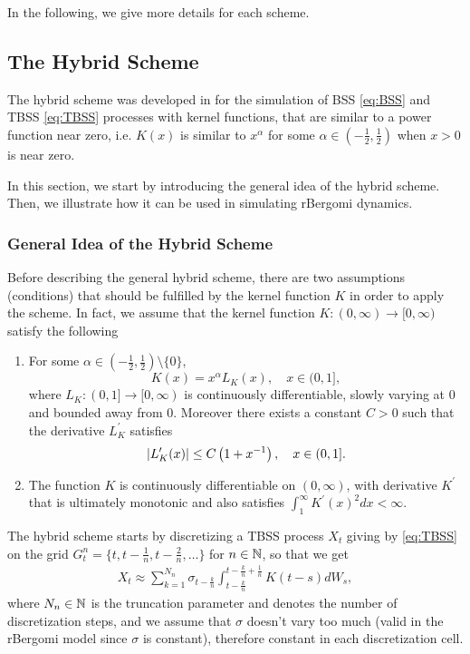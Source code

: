In the following, we give more details for each scheme. 



\subsection{The Hybrid Scheme}
The hybrid scheme was developed in \cite{bennedsen2017hybrid} for the simulation
of BSS \eqref{eq:BSS} and TBSS \eqref{eq:TBSS} processes with kernel functions, that are similar to a power function near zero, i.e. $K(x)$ is similar to $x^\alpha$ for some $\alpha \in(-\frac{1}{2},\frac{1}{2})$ when $x>0$ is near zero. 

In this section, we start by introducing the general idea of the hybrid scheme. Then, we illustrate how it can be used in simulating  rBergomi  dynamics.
\subsubsection{General Idea of the Hybrid Scheme}
Before describing the general hybrid scheme, there are two assumptions (conditions) that should be fulfilled by the kernel function $K$ in order to apply the scheme. In fact, we assume that the kernel function $K:(0,\infty)\rightarrow [0,\infty)$ satisfy the following
\begin{enumerate}
\item For some $\alpha \in(-\frac{1}{2},\frac{1}{2})\setminus\{0\}$,
$$ K(x)=x^\alpha L_K(x),\quad x \in (0,1],$$
where $L_K:(0,1] \rightarrow [0,\infty)$ is continuously differentiable, slowly varying at $0$ and bounded away from $0$. Moreover there exists a constant $C>0$ such that the derivative $L^\prime_K$ satisfies
$$ \left\lvert L_K^\prime(x)\right\rvert \le C \left(1+x^{-1}\right),\quad x \in (0,1].$$
\item The function $K$ is continuously differentiable on $(0,\infty)$, with derivative $K^\prime$ that is ultimately monotonic and also satisfies $\int_{1}^ \infty K^\prime(x)^2 dx<\infty$.
\end{enumerate}
The hybrid scheme starts by discretizing a TBSS process $X_t$ giving by \eqref{eq:TBSS} on the grid $G_{t}^n=\{t,t-\frac{1}{n},t-\frac{2}{n},\dots\}$ for $n \in \mathbb{N}$, so that we get
\begin{align}\label{eq:hybrid_scheme_1}
X_t \approx \sum_{k=1}^{N_n} \sigma_{t-\frac{k}{n}} \int_{t-\frac{k}{n}}^{t-\frac{k}{n}+\frac{1}{n}} K(t-s)  dW_s,
\end{align}
 where $N_n \in \mathbb{N}$ is the truncation parameter and denotes the number of discretization steps, and we assume that $\sigma$ doesn’t vary too much (valid in the rBergomi model since $\sigma$ is constant), therefore constant in each discretization cell.
 
